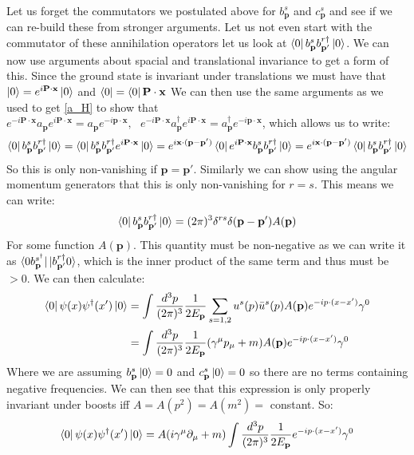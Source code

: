 \documentclass[11pt]{article}
\numberwithin{equation}{section}
\begin{document}
\begin{itemize}
Let us forget the commutators we postulated above for $b^{s}_{\textbf{p}}$ and $c^{s}_{\textbf{p}}$ and see if we can re-build these from stronger arguments. Let us not even start with the commutator of these annihilation operators let us look at $\bra{0}b^{s}_{\textbf{p}}b^{r \dagger}_{\textbf{p}'}\ket{0}$. We can now use arguments about spacial and translational invariance to get a form of this. Since the ground state is invariant under translations we must have that $\ket{0}=e^{i\textbf{P}\cdot \textbf{x}}\ket{0}$ and $\bra{0} = \bra{0}\textbf{P}\cdot \textbf{x}$ We can then use the same arguments as we used to get \ref{a_H} to show that $e^{-i\textbf{P}\cdot \textbf{x}}a_{\textbf{p}}e^{i\textbf{P}\cdot \textbf{x}} = a_{\textbf{p}}e^{-i\textbf{p}\cdot \textbf{x}},~~~e^{-i\textbf{P}\cdot \textbf{x}}a^{\dagger}_{\textbf{p}}e^{i\textbf{P}\cdot \textbf{x}} = a^{\dagger}_{\textbf{p}}e^{-i\textbf{p}\cdot \textbf{x}}$, which allows us to write:
\begin{align*}
  \bra{0}b^{s}_{\textbf{p}}b^{r \dagger}_{\textbf{p}'}\ket{0} = \bra{0}b^{s}_{\textbf{p}}b^{r \dagger}_{\textbf{p}'}e^{i\textbf{P}\cdot \textbf{x}}\ket{0} = e^{i\textbf{x}\cdot(\textbf{p}-\textbf{p}')}\bra{0}e^{i\textbf{P}\cdot \textbf{x}}b^{s}_{\textbf{p}}b^{r \dagger}_{\textbf{p}'}\ket{0}=e^{i\textbf{x}\cdot(\textbf{p}-\textbf{p}')}\bra{0}b^{s}_{\textbf{p}}b^{r \dagger}_{\textbf{p}'}\ket{0}
\end{align*}
So this is only non-vanishing if $\textbf{p}=\textbf{p}'$. Similarly we can show using the angular momentum generators that this is only non-vanishing for $r=s$. This means we can write:
\begin{align*}
  \bra{0}b^{s}_{\textbf{p}}b^{r \dagger}_{\textbf{p}'}\ket{0} = (2\pi)^3\delta^{rs}\delta(\textbf{p}-\textbf{p}')A(\textbf{p})
\end{align*}
For some function $A(\textbf{p})$. This quantity must be non-negative as we can write it as $\bra{0b^{s ^\dagger}_{\textbf{p}}}\ket{b^{r \dagger}_{\textbf{p}'}0}$, which is the inner product of the same term and thus must be $>0$. We can then calculate:
\begin{align*}
  \bra{0}\psi(x)\psi^{\dagger}(x')\ket{0} & = \int  \frac{d^3p}{(2\pi)^3}\frac{1}{2E_{\textbf{p}}}\sum_{s=1,2}u^{s}(p)\bar{u}^{s}(p)A(\textbf{p})e^{-ip \cdot (x-x')} \gamma^{0} \\ 
  &  = \int  \frac{d^3p}{(2\pi)^3}\frac{1}{2E_{\textbf{p}}}(\gamma^{\mu}p_{\mu}+m)A(\textbf{p})e^{-ip\cdot (x-x')} \gamma^{0}
\end{align*}
Where we are assuming $b^{s}_{\textbf{p}}\ket{0} = 0$ and $c^{s}_{\textbf{p}}\ket{0}= 0$ so there are no terms containing negative frequencies. We can then see that this expression is only properly invariant under boosts iff $A = A(p^2) = A(m^2) = $ constant. So:
\begin{align*}
  \bra{0}\psi(x)\psi^{\dagger}(x')\ket{0}= A(i\gamma^{\mu}\partial_{\mu}+m)\int  \frac{d^3p}{(2\pi)^3}\frac{1}{2E_{\textbf{p}}}e^{-ip\cdot (x-x')} \gamma^{0}
\end{align*}




\end{itemize}
\end{document}
